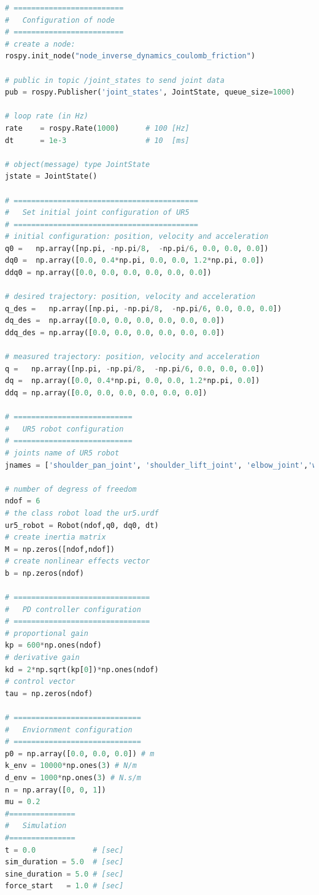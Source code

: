 \begin{lstlisting}[language=Python,caption={Move the second and fifth joint of UR5 robot with the required movement of activity 2.8.}, label={lst:inverse_dynamics_coulomb_friction}]
# =========================
#   Configuration of node
# =========================
# create a node: 
rospy.init_node("node_inverse_dynamics_coulomb_friction")

# public in topic /joint_states	to send joint data	
pub = rospy.Publisher('joint_states', JointState, queue_size=1000)

# loop rate (in Hz)
rate 	= rospy.Rate(1000)		# 100 [Hz]
dt 		= 1e-3					# 10  [ms]

# object(message) type JointState
jstate = JointState()

# ==========================================
#   Set initial joint configuration of UR5
# ==========================================
# initial configuration: position, velocity and acceleration 
q0 =   np.array([np.pi, -np.pi/8,  -np.pi/6, 0.0, 0.0, 0.0])
dq0 =  np.array([0.0, 0.4*np.pi, 0.0, 0.0, 1.2*np.pi, 0.0]) 
ddq0 = np.array([0.0, 0.0, 0.0, 0.0, 0.0, 0.0]) 

# desired trajectory: position, velocity and acceleration
q_des =   np.array([np.pi, -np.pi/8,  -np.pi/6, 0.0, 0.0, 0.0]) 
dq_des =  np.array([0.0, 0.0, 0.0, 0.0, 0.0, 0.0]) 
ddq_des = np.array([0.0, 0.0, 0.0, 0.0, 0.0, 0.0]) 

# measured trajectory: position, velocity and acceleration
q =   np.array([np.pi, -np.pi/8,  -np.pi/6, 0.0, 0.0, 0.0])
dq =  np.array([0.0, 0.4*np.pi, 0.0, 0.0, 1.2*np.pi, 0.0]) 
ddq = np.array([0.0, 0.0, 0.0, 0.0, 0.0, 0.0]) 

# ===========================
#   UR5 robot configuration
# ===========================
# joints name of UR5 robot
jnames = ['shoulder_pan_joint', 'shoulder_lift_joint', 'elbow_joint','wrist_1_joint', 'wrist_2_joint', 'wrist_3_joint']

# number of degress of freedom
ndof = 6
# the class robot load the ur5.urdf
ur5_robot = Robot(ndof,q0, dq0, dt)
# create inertia matrix 
M = np.zeros([ndof,ndof])
# create nonlinear effects vector
b = np.zeros(ndof)

# ===============================
#   PD controller configuration
# ===============================
# proportional gain
kp = 600*np.ones(ndof)
# derivative gain
kd = 2*np.sqrt(kp[0])*np.ones(ndof)
# control vector
tau = np.zeros(ndof) 

# =============================
#   Enviornment configuration
# =============================
p0 = np.array([0.0, 0.0, 0.0]) # m
k_env = 10000*np.ones(3) # N/m
d_env = 1000*np.ones(3) # N.s/m
n = np.array([0, 0, 1])
mu = 0.2
#===============
#   Simulation
#===============
t = 0.0             # [sec] 
sim_duration = 5.0  # [sec]
sine_duration = 5.0 # [sec]
force_start   = 1.0 # [sec]



\end{lstlisting}
